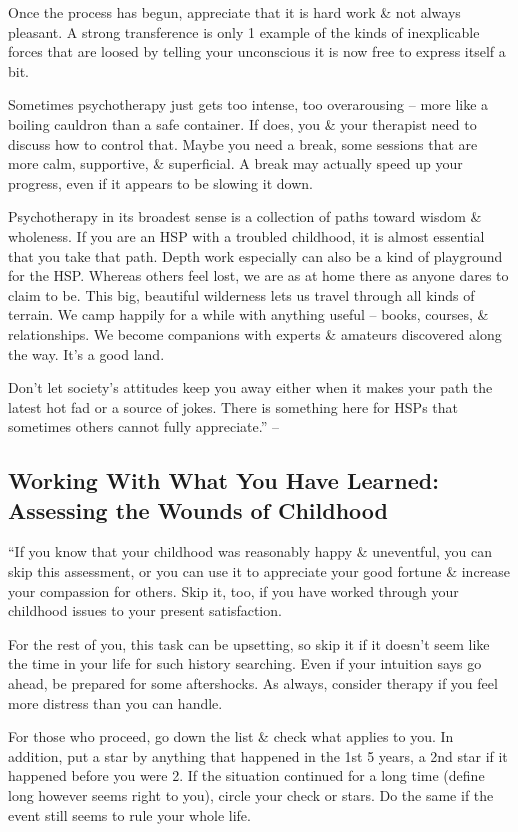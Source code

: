 \documentclass{article}
\numberwithin{equation}{section}
\begin{document}
Once the process has begun, appreciate that it is hard work \& not always pleasant. A strong transference is only 1 example of the kinds of inexplicable forces that are loosed by telling your unconscious it is now free to express itself a bit.

Sometimes psychotherapy just gets too intense, too overarousing -- more like a boiling cauldron than a safe container. If does, you \& your therapist need to discuss how to control that. Maybe you need a break, some sessions that are more calm, supportive, \& superficial. A break may actually speed up your progress, even if it appears to be slowing it down.

Psychotherapy in its broadest sense is a collection of paths toward wisdom \& wholeness. If you are an HSP with a troubled childhood, it is almost essential that you take that path. Depth work especially can also be a kind of playground for the HSP. Whereas others feel lost, we are as at home there as anyone dares to claim to be. This big, beautiful wilderness lets us travel through all kinds of terrain. We camp happily for a while with anything useful -- books, courses, \& relationships. We become companions with experts \& amateurs discovered along the way. It's a good land.

Don't let society's attitudes keep you away either when it makes your path the latest hot fad or a source of jokes. There is something here for HSPs that sometimes others cannot fully appreciate.'' -- \cite[p. 216]{Aron2013}

\subsection{Working With What You Have Learned: Assessing the Wounds of Childhood}
``If you know that your childhood was reasonably happy \& uneventful, you can skip this assessment, or you can use it to appreciate your good fortune \& increase your compassion for others. Skip it, too, if you have worked through your childhood issues to your present satisfaction.

For the rest of you, this task can be upsetting, so skip it if it doesn't seem like the time in your life for such history searching. Even if your intuition says go ahead, be prepared for some aftershocks. As always, consider therapy if you feel more distress than you can handle.

For those who proceed, go down the list \& check what applies to you. In addition, put a star by anything that happened in the 1st 5 years, a 2nd star if it happened before you were 2. If the situation continued for a long time (define long however seems right to you), circle your check or stars. Do the same if the event still seems to rule your whole life.
\end{document}
